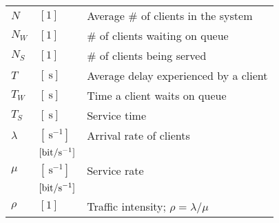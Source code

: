 \documentclass{form}
\begin{document}
\begin{center}
\begin{minipage}{0.49\textwidth}
\begin{tabular}{l l | p{59mm}}
        \end{tabular}
    \end{minipage}
    \begin{minipage}{0.49\textwidth}
        \begin{tabular}{l l | p{59mm}}
            $N$           & $[1                       ]$ & Average \# of clients in the system                         \\
            $N_W$         & $[1                       ]$ & \# of clients waiting on queue                              \\
            $N_S$         & $[1                       ]$ & \# of clients being served                                  \\
            $T$           & $[\SI{}{\second}          ]$ & Average delay experienced by a client                       \\
            $T_W$         & $[\SI{}{\second}          ]$ & Time a client waits on queue                                \\
            $T_S$         & $[\SI{}{\second}          ]$ & Service time                                                \\
            $\lambda$     & $[\SI{}{     \second^{-1}}]$ & Arrival rate of clients                                     \\
                          & $[\SI{}{\bit/\second^{-1}}]$ &                                                             \\
            $\mu$         & $[\SI{}{     \second^{-1}}]$ & Service rate                                                \\
                          & $[\SI{}{\bit/\second^{-1}}]$ &                                                             \\
            $\rho$        & $[1                       ]$ & Traffic intensity; $\rho = \lambda/\mu$                     \\
        \end{tabular}
    \end{minipage}
\end{center}
\end{document}
